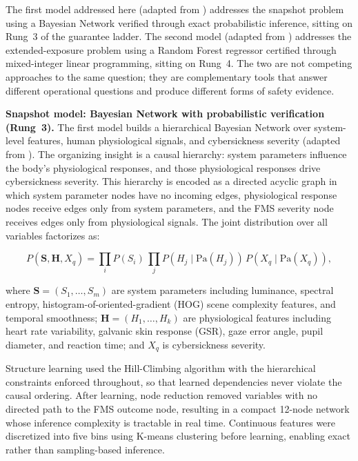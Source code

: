 \documentclass[graybox]{svmult}
\begin{document}
The first model addressed here (adapted from \cite{}) addresses the snapshot problem using a Bayesian Network verified through exact probabilistic inference, sitting on Rung~3 of the guarantee ladder. The second model (adapted from \cite{}) addresses the extended-exposure problem using a Random Forest regressor certified through mixed-integer linear programming, sitting on Rung~4. The two are not competing approaches to the same question; they are complementary tools that answer different operational questions and produce different forms of safety evidence.

\textbf{Snapshot model: Bayesian Network with probabilistic verification (Rung~3).}
The first model builds a hierarchical Bayesian Network over system-level features, human physiological signals, and cybersickness severity (adapted from \cite{}). The organizing insight is a causal hierarchy: system parameters influence the body's physiological responses, and those physiological responses drive cybersickness severity. This hierarchy is encoded as a directed acyclic graph in which system parameter nodes have no incoming edges, physiological response nodes receive edges only from system parameters, and the FMS severity node receives edges only from physiological signals. The joint distribution over all variables factorizes as:

\begin{equation}
P(\mathbf{S}, \mathbf{H}, X_q) = \prod_i P(S_i)\,\prod_j P(H_j \mid \mathrm{Pa}(H_j))\,P(X_q \mid \mathrm{Pa}(X_q)),
\end{equation}

where $\mathbf{S} = (S_1, \dots, S_m)$ are system parameters including luminance, spectral entropy, histogram-of-oriented-gradient (HOG) scene complexity features, and temporal smoothness; $\mathbf{H} = (H_1, \dots, H_k)$ are physiological features including heart rate variability, galvanic skin response (GSR), gaze error angle, pupil diameter, and reaction time; and $X_q$ is cybersickness severity.

Structure learning used the Hill-Climbing algorithm with the hierarchical constraints enforced throughout, so that learned dependencies never violate the causal ordering. After learning, node reduction removed variables with no directed path to the FMS outcome node, resulting in a compact 12-node network whose inference complexity is tractable in real time. Continuous features were discretized into five bins using K-means clustering before learning, enabling exact rather than sampling-based inference.
\end{document}
